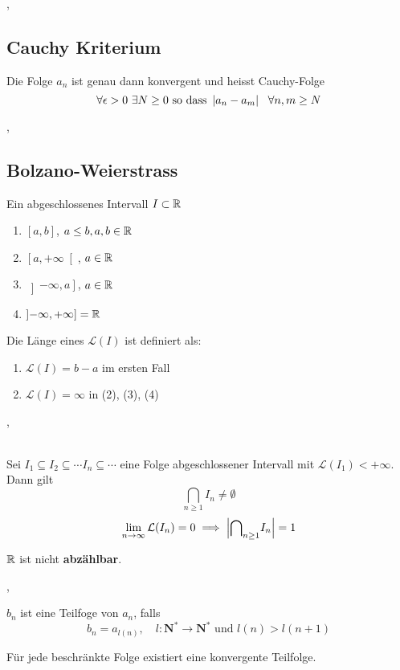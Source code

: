 \sep 

\subsection{Cauchy Kriterium}

 Die Folge $a_{n}$ ist genau dann konvergent und heisst Cauchy-Folge
\[
\forall \epsilon > 0 \ \exists N \geq 0 \text{ so dass } \left\lvert a_{n} - a_{m} \right\rvert \ \ \forall n, m \geq N
\]

\sep

\subsection{Bolzano-Weierstrass}

\Def[2.5.1] Ein abgeschlossenes Intervall $I \subset \mathbb{R}$ 
\begin{enumerate}
\item[1)] $\left[ a, b \right]$, $a \leq b, a, b \in \mathbb{R}$
\item[2)] $\left[ a, +\infty \right[$, $a \in \mathbb{R}$
\item[3)] $\left] -\infty, a \right]$, $a \in \mathbb{R}$
\item[4)] $\left] -\infty, +\infty \right] = \mathbb{R}$
\end{enumerate}

Die Länge eines $\mathcal{L}(I)$ ist definiert als:
\begin{enumerate} 
\item[•] $\mathcal{L}(I) = b - a$   \quad im ersten Fall
\item[•] $\mathcal{L}(I) = \infty$  \qquad in (2), (3), (4)
\end{enumerate}
\sep

\\ Sei ${I_{1} \subseteq I_{2} \subseteq \cdots I_{n} \subseteq \cdots}$ eine Folge abgeschlossener Intervall mit $\mathcal{L}(I_{1}) < +\infty$. Dann gilt
\[ {\bigcap}_{n\geq1} I_{n} \neq \emptyset \]
\[ \lim\limits_{n \rightarrow \infty} \mathcal{L}(I_{n}) = 0 \implies \left\lvert {\bigcap}_{n\geq1} I_{n} \right\rvert = 1\]

\Satz[2.5.6] $\mathbb{R}$ ist nicht \textbf{abzählbar}.

\sep

\Def[2.5.7] $b_{n}$ ist eine Teilfoge von $a_{n}$, falls 
\[b_{n} = a_{l(n)}, \quad l : \mathbf{N}^{*} \rightarrow \mathbf{N}^{*} \text{ und } l(n) > l(n + 1) \]

 Für jede beschränkte Folge existiert eine konvergente Teilfolge.

